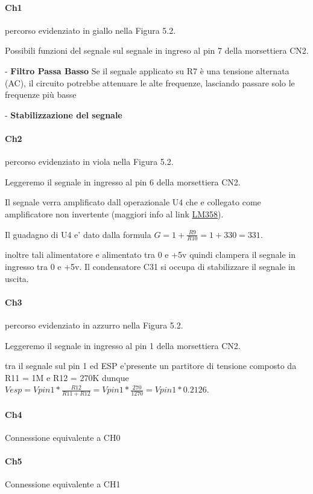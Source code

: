 \documentclass[12pt,a4paper]{report}
\begin{document}
\paragraph{Ch1}
percorso evidenziato in giallo nella Figura 5.2.

Possibili funzioni del segnale sul segnale in ingreso al pin 7 della morsettiera CN2.

- \textbf{Filtro Passa Basso}
Se il segnale applicato su R7 è una tensione alternata (AC), il circuito potrebbe attenuare le alte frequenze, lasciando passare solo le frequenze più basse

- \textbf{Stabilizzazione del segnale}

\paragraph{Ch2}
percorso evidenziato in viola nella Figura 5.2.

Leggeremo il segnale in ingresso al pin 6 della morsettiera CN2.

Il segnale verra amplificato dall operazionale U4 che e collegato come amplificatore non invertente (maggiori info al link \href{https://elettronicasemplice.weebly.com/amplificatore-operazionale-non-invertente.html}{LM358}).

Il guadagno di U4 e' dato dalla formula $G = 1 + \frac{R9}{R10}= 1+330 = 331 $.

inoltre tali alimentatore e alimentato tra 0 e +5v quindi clampera il segnale in ingresso tra 0 e +5v.
Il condensatore C31 si occupa di stabilizzare il segnale in uscita.

\paragraph{Ch3}
percorso evidenziato in azzurro nella Figura 5.2.

Leggeremo il segnale in ingresso al pin 1 della morsettiera CN2.

tra il segnale sul pin 1 ed ESP e'presente un partitore di tensione composto da R11 = 1M e R12 = 270K dunque $Vesp = Vpin1 * \frac{R12}{R11+R12} = Vpin1 * \frac{270}{1270} = Vpin1 * 0.2126$.


\paragraph{Ch4}
Connessione equivalente a CH0 

\paragraph{Ch5}
Connessione equivalente a CH1
\end{document}
